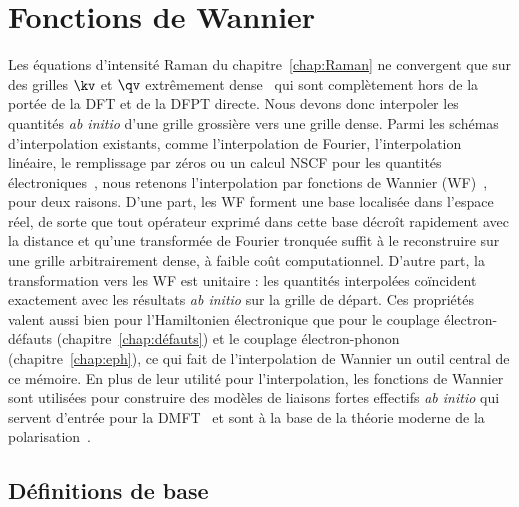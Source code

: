 \section{Fonctions de Wannier}\label{sec:wannier}

Les équations d'intensité Raman du chapitre~\ref{chap:Raman} ne convergent que sur des grilles $\kv$ et $\qv$ extrêmement dense~\cite{venezuelaTheoryDoubleresonantRaman2011,gilletFirstprinciplesStudyExcitonic2013a} qui sont complètement hors de la portée de la DFT et de la DFPT directe. Nous devons donc interpoler les quantités \textit{ab initio} d'une grille grossière vers une grille dense. Parmi les schémas d'interpolation existants, comme l'interpolation de Fourier, l'interpolation linéaire, le remplissage par zéros ou un calcul NSCF pour les quantités électroniques~\cite{madsenBoltzTraP2ProgramInterpolating2018,bruninPhononlimitedElectronMobility2020,liElectricalTransportLimited2015}, nous retenons l'interpolation par fonctions de Wannier (WF)~\cite{ponceEPWElectronphononCoupling2016}, pour deux raisons. D'une part, les WF forment une base localisée dans l'espace réel, de sorte que tout opérateur exprimé dans cette base décroît rapidement avec la distance et qu'une transformée de Fourier tronquée suffit à le reconstruire sur une grille arbitrairement dense, à faible coût computationnel. D'autre part, la transformation vers les WF est unitaire : les quantités interpolées coïncident exactement avec les résultats \textit{ab initio} sur la grille de départ. Ces propriétés valent aussi bien pour l'Hamiltonien électronique que pour le couplage électron-défauts (chapitre~\ref{chap:défauts}) et le couplage électron-phonon (chapitre~\ref{chap:eph}), ce qui fait de l'interpolation de Wannier un outil central de ce mémoire. En plus de leur utilité pour l'interpolation, les fonctions de Wannier sont utilisées pour construire des modèles de liaisons fortes effectifs \textit{ab initio} qui servent d'entrée pour la DMFT~\cite{lechermannDynamicalMeanfieldTheory2006} et sont à la base de la théorie moderne de la polarisation~\cite{king-smithTheoryPolarizationCrystalline1993,restaMacroscopicPolarizationCrystalline1994}.

\subsection{Définitions de base}

